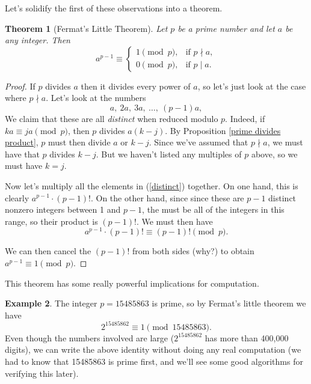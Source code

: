 \documentclass[12pt]{article}
\theoremstyle{plain}
\newtheorem{theorem}{Theorem}[section]
\theoremstyle{definition}
\newtheorem{example}[theorem]{Example}
\theoremstyle{remark}
\begin{document}
Let's solidify the first of these observations into a theorem.
\begin{theorem}[Fermat's Little Theorem]
    Let $p$ be a prime number and let $a$ be any integer. Then
    \[
        a^{p-1} \equiv \begin{cases}
            1\pmod p,&\text{if }p\nmid a,\\
            0\pmod p,&\text{if }p\mid a.
        \end{cases}
    \]
\end{theorem}
\begin{proof}
    If $p$ divides $a$ then it divides every power of $a$, so let's just look at the case where $p\nmid a$.
    Let's look at the numbers
    \begin{equation}\label{distinct}
        a,\ 2a,\ 3a,\ \ldots,\ (p-1)a,
    \end{equation}
    We claim that these are all \emph{distinct} when reduced modulo $p$.
    Indeed, if $ka \equiv ja\pmod p$, then $p$ divides $a(k-j)$.
    By Proposition \ref{prime divides product}, $p$ must then divide $a$ or $k-j$.
    Since we've assumed that $p\nmid a$, we must have that $p$ divides $k-j$.
    But we haven't listed any multiples of $p$ above, so we must have $k=j$.

    Now let's multiply all the elements in (\ref{distinct}) together.
    On one hand, this is clearly $a^{p-1}\cdot (p-1)!$.
    On the other hand, since since these are $p-1$ distinct nonzero integers between 1 and $p-1$, the must be all of the integers in this range, so their product is $(p-1)!$.
    We must then have
    \[
        a^{p-1}\cdot (p-1)! \equiv (p-1)!\pmod p.
    \]

    We can then cancel the $(p-1)!$ from both sides (why?) to obtain $a^{p-1}\equiv 1\pmod p$.
\end{proof}

This theorem has some really powerful implications for computation.

\begin{example}
    The integer $p = 15485863$ is prime, so by Fermat's little theorem we have
    \[
        2^{15485862} \equiv 1\pmod {15485863}.
    \]
    Even though the numbers involved are large ($2^{15485862}$ has more than 400,000 digits), we can write the above identity without doing any real computation (we had to know that 15485863 is prime first, and we'll see some good algorithms for verifying this later).
\end{example}
\end{document}
